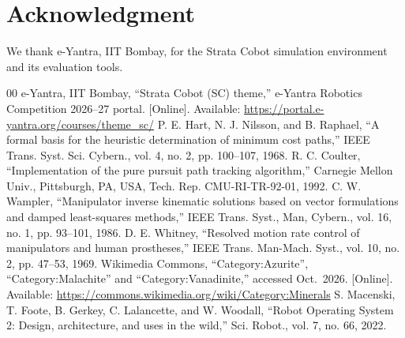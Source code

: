 \documentclass[conference]{IEEEtran}
\begin{document}
\section*{Acknowledgment}
We thank e-Yantra, IIT Bombay, for the Strata Cobot simulation environment and its evaluation tools.

\begin{thebibliography}{00}
 e-Yantra, IIT Bombay, ``Strata Cobot (SC) theme,'' e-Yantra Robotics Competition 2026--27 portal. [Online]. Available: \url{https://portal.e-yantra.org/courses/theme_sc/}
 P. E. Hart, N. J. Nilsson, and B. Raphael, ``A formal basis for the heuristic determination of minimum cost paths,'' IEEE Trans. Syst. Sci. Cybern., vol. 4, no. 2, pp. 100--107, 1968.
 R. C. Coulter, ``Implementation of the pure pursuit path tracking algorithm,'' Carnegie Mellon Univ., Pittsburgh, PA, USA, Tech. Rep. CMU-RI-TR-92-01, 1992.
 C. W. Wampler, ``Manipulator inverse kinematic solutions based on vector formulations and damped least-squares methods,'' IEEE Trans. Syst., Man, Cybern., vol. 16, no. 1, pp. 93--101, 1986.
 D. E. Whitney, ``Resolved motion rate control of manipulators and human prostheses,'' IEEE Trans. Man-Mach. Syst., vol. 10, no. 2, pp. 47--53, 1969.
 Wikimedia Commons, ``Category:Azurite'', ``Category:Malachite'' and ``Category:Vanadinite,'' accessed Oct.\ 2026. [Online]. Available: \url{https://commons.wikimedia.org/wiki/Category:Minerals}
 S. Macenski, T. Foote, B. Gerkey, C. Lalancette, and W. Woodall, ``Robot Operating System 2: Design, architecture, and uses in the wild,'' Sci. Robot., vol. 7, no. 66, 2022.
\end{thebibliography}
\end{document}
